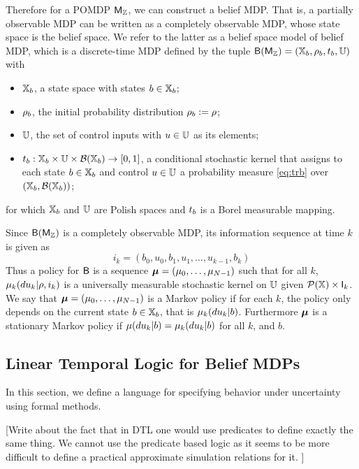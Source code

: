 \documentclass{ifacconf}
\newcommand{\red}[1]{{\color{red} #1}}
\begin{document}
Therefore for a POMDP $\mathsf{M}_{{\mathbb{Z}}}$, we can construct a belief MDP. 
 That is, a partially observable MDP can be written as a completely observable MDP, whose state space is the belief space. We refer to the latter as a belief space model of belief MDP, which is a
discrete-time MDP defined by the tuple $\mathsf{B}(\mathsf{M}_{{\mathbb{Z}}}) = ({{\mathbb{X}}_b}, \rho_b, t_b, {\mathbb{U}})$ with
  \begin{itemize}
    \item ${{\mathbb{X}}_b}$,  a state space with states $b\in{{\mathbb{X}}_b}$; %
    \item $\rho_b$, the initial probability distribution $\rho_b:=\rho$;
    \item ${\mathbb{U}}$, the set of control inputs with $u\in{\mathbb{U}}$ as its elements;
    \item $t_b:{{\mathbb{X}}_b}\times{\mathbb{U}}\times\mathcal B({{\mathbb{X}}_b})\rightarrow[0,1]$, a conditional stochastic kernel that assigns to each state $b\in {{\mathbb{X}}_b}$ and control $u\in {\mathbb{U}}$ a probability measure \eqref{eq:trb} over $({{\mathbb{X}}_b},\mathcal B({{\mathbb{X}}_b}))$;
  \end{itemize}
  for which ${{\mathbb{X}}_b}$ and ${\mathbb{U}}$ are  Polish spaces \citep{bertsekas2004stochastic} and $t_b$ is a Borel measurable mapping.

Since $\mathsf{B}(\mathsf{M}_{{\mathbb{Z}}})$ is a completely observable MDP, its information sequence at time $k$ is given as  
\[i_k=(b_0, u_0, b_1, u_1, \ldots, u_{k-1},b_k)\]
Thus	a policy for $\mathsf{B}$ is a sequence ${\boldsymbol{\mu}}=({\mu}_0,\ldots,{\mu}_{N-1})$ such that  for all $k$, ${\mu}_k(du_k|\rho, i_k)$ is a universally measurable stochastic kernel on ${\mathbb{U}}$  given $\mathcal{P}({\mathbb{X}})\times {\mathsf{I}}_k$.
	We say that ${\boldsymbol{\mu}}=({\mu}_0,\ldots,{\mu}_{N-1})$ is a Markov policy if for each $k$, the policy only depends on the current state $b\in{{\mathbb{X}}_b}$, that is ${\mu}_k(du_k|b)$.
	Furthermore 	 ${\boldsymbol{\mu}}$ is a stationary Markov policy if ${\mu}(du_k|b)= {\mu}_k(du_k|b)$ for all $k$, and $b$.
	
	

\subsection{Linear Temporal Logic for Belief MDPs}

	In this section, we define a language for specifying behavior under uncertainty using formal methods. 
	
	
	\red{[Write about the fact that in DTL one would use predicates to define exactly the same thing. We cannot use the predicate based logic as it seems to be more difficult to define a practical approximate simulation relations for it. ]}
	
\end{document}
